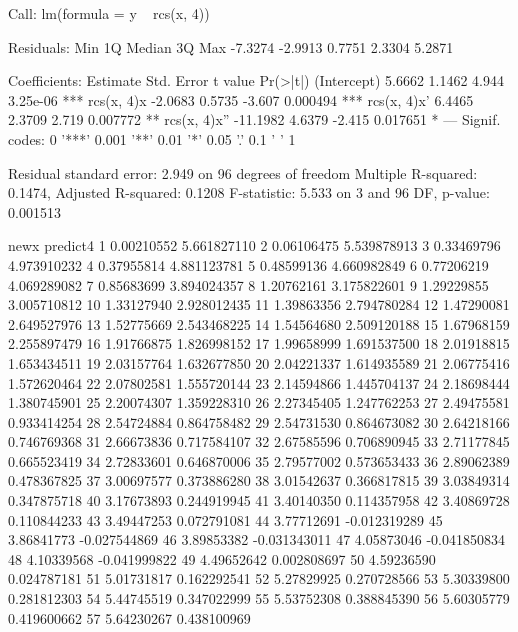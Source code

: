 \begin{Schunk}
\begin{Soutput}
Call:
lm(formula = y ~ rcs(x, 4))

Residuals:
    Min      1Q  Median      3Q     Max 
-7.3274 -2.9913  0.7751  2.3304  5.2871 

Coefficients:
             Estimate Std. Error t value Pr(>|t|)    
(Intercept)    5.6662     1.1462   4.944 3.25e-06 ***
rcs(x, 4)x    -2.0683     0.5735  -3.607 0.000494 ***
rcs(x, 4)x'    6.4465     2.3709   2.719 0.007772 ** 
rcs(x, 4)x'' -11.1982     4.6379  -2.415 0.017651 *  
---
Signif. codes:  0 '***' 0.001 '**' 0.01 '*' 0.05 '.' 0.1 ' ' 1 

Residual standard error: 2.949 on 96 degrees of freedom
Multiple R-squared: 0.1474,	Adjusted R-squared: 0.1208 
F-statistic: 5.533 on 3 and 96 DF,  p-value: 0.001513 
\end{Soutput}
\begin{Soutput}
          newx     predict4
1   0.00210552  5.661827110
2   0.06106475  5.539878913
3   0.33469796  4.973910232
4   0.37955814  4.881123781
5   0.48599136  4.660982849
6   0.77206219  4.069289082
7   0.85683699  3.894024357
8   1.20762161  3.175822601
9   1.29229855  3.005710812
10  1.33127940  2.928012435
11  1.39863356  2.794780284
12  1.47290081  2.649527976
13  1.52775669  2.543468225
14  1.54564680  2.509120188
15  1.67968159  2.255897479
16  1.91766875  1.826998152
17  1.99658999  1.691537500
18  2.01918815  1.653434511
19  2.03157764  1.632677850
20  2.04221337  1.614935589
21  2.06775416  1.572620464
22  2.07802581  1.555720144
23  2.14594866  1.445704137
24  2.18698444  1.380745901
25  2.20074307  1.359228310
26  2.27345405  1.247762253
27  2.49475581  0.933414254
28  2.54724884  0.864758482
29  2.54731530  0.864673082
30  2.64218166  0.746769368
31  2.66673836  0.717584107
32  2.67585596  0.706890945
33  2.71177845  0.665523419
34  2.72833601  0.646870006
35  2.79577002  0.573653433
36  2.89062389  0.478367825
37  3.00697577  0.373886280
38  3.01542637  0.366817815
39  3.03849314  0.347875718
40  3.17673893  0.244919945
41  3.40140350  0.114357958
42  3.40869728  0.110844233
43  3.49447253  0.072791081
44  3.77712691 -0.012319289
45  3.86841773 -0.027544869
46  3.89853382 -0.031343011
47  4.05873046 -0.041850834
48  4.10339568 -0.041999822
49  4.49652642  0.002808697
50  4.59236590  0.024787181
51  5.01731817  0.162292541
52  5.27829925  0.270728566
53  5.30339800  0.281812303
54  5.44745519  0.347022999
55  5.53752308  0.388845390
56  5.60305779  0.419600662
57  5.64230267  0.438100969

\end{Soutput}
\end{Schunk}
